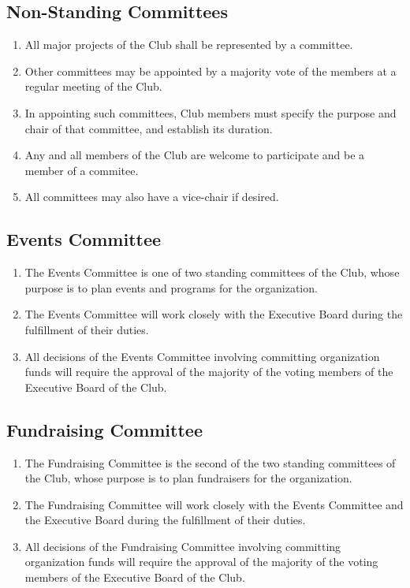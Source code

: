 \documentclass[12pt]{scrartcl} %
\begin{document}
	\subsection{Non-Standing Committees}
		\begin{enumerate}
			\item All major projects of the Club shall be represented by a committee.
			\item Other committees may be appointed by a majority vote of the members at a regular meeting of the Club.
			\item In appointing such committees, Club members must specify the purpose and chair of that committee, and establish its duration.
			\item Any and all members of the Club are welcome to participate and be a member of a commitee.
			\item All committees may also have a vice-chair if desired.
		\end{enumerate}


	\subsection{Events Committee}
		\begin{enumerate}
			\item The Events Committee is one of two standing committees of the Club, whose purpose is to plan events and programs for the organization.
			\item The Events Committee will work closely with the Executive Board during the fulfillment of their duties.
			\item All decisions of the Events Committee involving committing organization funds will require the approval of the majority of the voting members of the Executive Board of the Club.
		\end{enumerate}
		
	\subsection{Fundraising Committee}
		\begin{enumerate}
			\item The Fundraising Committee is the second of the two standing committees of the Club, whose purpose is to plan fundraisers for the organization.
			\item The Fundraising Committee will work closely with the Events Committee and the Executive Board during the fulfillment of their duties.
			\item All decisions of the Fundraising Committee involving committing organization funds will require the approval of the majority of the voting members of the Executive Board of the Club.
		\end{enumerate}
		
\end{document}
